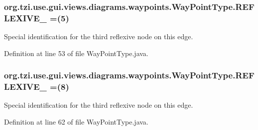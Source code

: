 \hypertarget{enumorg_1_1tzi_1_1use_1_1gui_1_1views_1_1diagrams_1_1waypoints_1_1_way_point_type_aff4ba2cf786817a3afd6912a3f1b7aee}{
\subsubsection[{R\-E\-F\-L\-E\-X\-I\-V\-E\-\_\-3}]{\setlength{\rightskip}{0pt plus 5cm}org.\-tzi.\-use.\-gui.\-views.\-diagrams.\-waypoints.\-Way\-Point\-Type.\-R\-E\-F\-L\-E\-X\-I\-V\-E\-\_ =(5)}}\label{enumorg_1_1tzi_1_1use_1_1gui_1_1views_1_1diagrams_1_1waypoints_1_1_way_point_type_aff4ba2cf786817a3afd6912a3f1b7aee}
Special identification for the third reflexive node on this edge. 

Definition at line 53 of file Way\-Point\-Type.\-java.

\hypertarget{enumorg_1_1tzi_1_1use_1_1gui_1_1views_1_1diagrams_1_1waypoints_1_1_way_point_type_ad71f1d2e593be9d7f76951e0c08bb428}{
\subsubsection[{R\-E\-F\-L\-E\-X\-I\-V\-E\-\_\-4}]{\setlength{\rightskip}{0pt plus 5cm}org.\-tzi.\-use.\-gui.\-views.\-diagrams.\-waypoints.\-Way\-Point\-Type.\-R\-E\-F\-L\-E\-X\-I\-V\-E\-\_ =(8)}}\label{enumorg_1_1tzi_1_1use_1_1gui_1_1views_1_1diagrams_1_1waypoints_1_1_way_point_type_ad71f1d2e593be9d7f76951e0c08bb428}
Special identification for the third reflexive node on this edge. 

Definition at line 62 of file Way\-Point\-Type.\-java.

